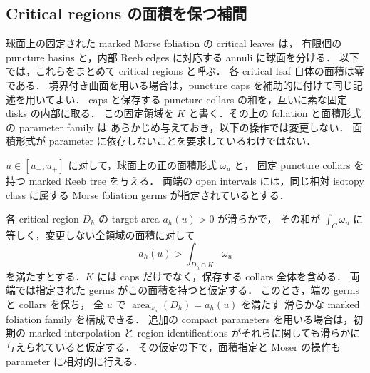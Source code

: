 \subsection{Critical regions の面積を保つ補間}

球面上の固定された marked Morse foliation の critical leaves は，
有限個の puncture basins と，内部 Reeb edges に対応する annuli に球面を分ける．
以下では，これらをまとめて critical regions と呼ぶ．
各 critical leaf 自体の面積は零である．
境界付き曲面を用いる場合は，puncture caps を補助的に付けて同じ記述を用いてよい．
caps と保存する puncture collars の和を，互いに素な固定 disks の内部に取る．
この固定領域を $K$ と書く．その上の foliation と面積形式の parameter family は
あらかじめ与えておき，以下の操作では変更しない．
面積形式が parameter に依存しないことを要求しているわけではない．

\begin{lemma}
\label{ng8:parametric-moser}
$u\in[u_-,u_+]$ に対して，球面上の正の面積形式 $\omega_u$ と，
固定 puncture collars を持つ marked Reeb tree を与える．
両端の open intervals には，同じ相対 isotopy class に属する
Morse foliation germs が指定されているとする．

各 critical region $D_h$ の target area $a_h(u)>0$ が滑らかで，
その和が $\int_C\omega_u$ に等しく，変更しない全領域の面積に対して
\begin{equation}\label{ng8:protected-area-margin}
 a_h(u)>\int_{D_h\cap K}\omega_u
\end{equation}
を満たすとする．$K$ には caps だけでなく，保存する collars 全体を含める．
両端では指定された germs がこの面積を持つと仮定する．
このとき，端の germs と collars を保ち，
全 $u$ で $\operatorname{area}_{\omega_u}(D_h)=a_h(u)$ を満たす
滑らかな marked foliation family を構成できる．
追加の compact parameters を用いる場合は，初期の marked interpolation と
region identifications がそれらに関しても滑らかに与えられていると仮定する．
その仮定の下で，面積指定と Moser の操作も parameter に相対的に行える．
\end{lemma}

